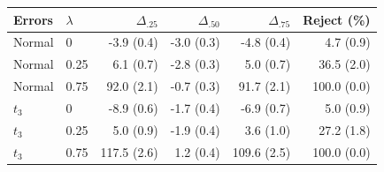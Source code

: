 \begin{tabular}{llrrrr}\toprule
Errors & $\lambda$ & $\Delta_{.25}$ & $\Delta_{.50}$ & $\Delta_{.75}$ & Reject (\%) \\ \midrule
Normal & 0 & -3.9 (0.4) & -3.0 (0.3) & -4.8 (0.4) & 4.7 (0.9) \\
Normal & 0.25 & 6.1 (0.7) & -2.8 (0.3) & 5.0 (0.7) & 36.5 (2.0) \\
Normal & 0.75 & 92.0 (2.1) & -0.7 (0.3) & 91.7 (2.1) & 100.0 (0.0) \\
$t_3$ & 0 & -8.9 (0.6) & -1.7 (0.4) & -6.9 (0.7) & 5.0 (0.9) \\
$t_3$ & 0.25 & 5.0 (0.9) & -1.9 (0.4) & 3.6 (1.0) & 27.2 (1.8) \\
$t_3$ & 0.75 & 117.5 (2.6) & 1.2 (0.4) & 109.6 (2.5) & 100.0 (0.0) \\
\bottomrule\end{tabular}
